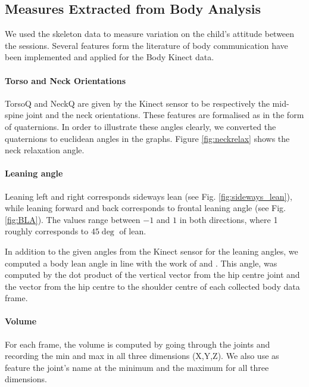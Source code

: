 \documentclass[a4paper,twocolumn]{svjour3}
\begin{document}






\subsection{Measures Extracted from Body Analysis}
We used the skeleton data to measure variation on the child's attitude between the sessions.
Several features form the literature of body communication have been implemented and applied for the Body Kinect data.


\paragraph{Torso and Neck Orientations}
TorsoQ and NeckQ are given by the Kinect sensor to be respectively the mid-spine joint and the neck orientations. 
These features are formalised as in the form of quaternions. 
In order to illustrate  these angles clearly, we converted the quaternions to euclidean angles in the graphs.
Figure \ref{fig:neckrelax} shows the neck relaxation angle.

\paragraph{Leaning angle}
Leaning left and right corresponds sideways lean (see Fig. \ref{fig:sideways_lean}), while leaning forward and back corresponds to frontal leaning angle (see Fig. \ref{fig:BLA}). 
The values range between $-1$ and $1$ in both directions, where 1 roughly corresponds to $45\deg$ of lean.

In addition to the given angles from the Kinect sensor for the leaning angles, we computed a body lean angle in line with the work of \cite{Castellano} and \cite{Schegloff}. This angle, was computed by the dot product of the vertical vector from the hip centre joint and the vector from the hip centre to the shoulder centre of each collected body data frame. 

\paragraph{Volume}
For each frame, the volume is computed by going through the joints and recording the min and max in all three dimensions (X,Y,Z). 
We also use as feature the joint's name at the minimum and the maximum for all three dimensions.
\end{document}
